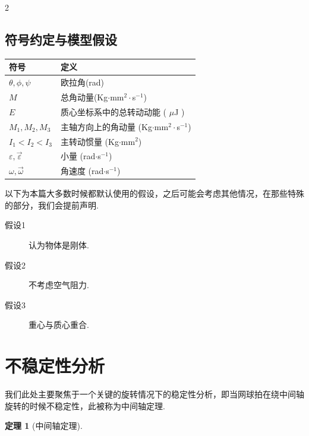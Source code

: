 \documentclass{CLGPY}
\newtheorem{thm}{定理}
\begin{document}
\begin{multicols}{2}
		\subsection{符号约定与模型假设}
		\begin{center}%
			\begin{tabular}{>{\small}l>{\footnotesize}l}%
				\toprule %
				\textbf{符号} & \textbf{\small 定义} \\%
				\midrule %
				$\theta, \phi ,\psi$   	&   欧拉角\:(rad)   \\
				$M$   					&   总角动量\:(Kg$\cdot$mm$^2 \cdot$s$^{-1}$)   \\
				$E$   					&   质心坐标系中的总转动动能\: ( $\mu$J )   \\
				$ M_1,M_2,M_3 $  	 	&   主轴方向上的角动量\: (Kg$\cdot$mm$^2 \cdot$s$^{-1}$)   \\
				$I_1<I_2<I_3$   		&   主转动惯量\: (Kg$\cdot$mm$^2$)   \\
				$\varepsilon,\vec{\varepsilon}$   &   小量\: (rad$\cdot$s$^{-1}$)   \\
				$\omega,\vec{\omega}$   &	角速度\: (rad$\cdot$s$^{-1}$)   \\
				\bottomrule %
			\end{tabular}
		\end{center}
		
		以下为本篇大多数时候都默认使用的假设，之后可能会考虑其他情况，在那些特殊的部分，我们会提前声明.
		
		\begin{description}
			\item[假设1]
			认为物体是刚体.
			\item[假设2]
			不考虑空气阻力.
			\item[假设3]
			重心与质心重合.
		\end{description}
		
		\section{不稳定性分析}
		我们此处主要聚焦于一个关键的旋转情况下的稳定性分析，即当网球拍在绕中间轴旋转的时候不稳定性，此被称为中间轴定理.
		
		\begin{thm}[中间轴定理]
			

\end{thm}
\end{multicols}
\end{document}
